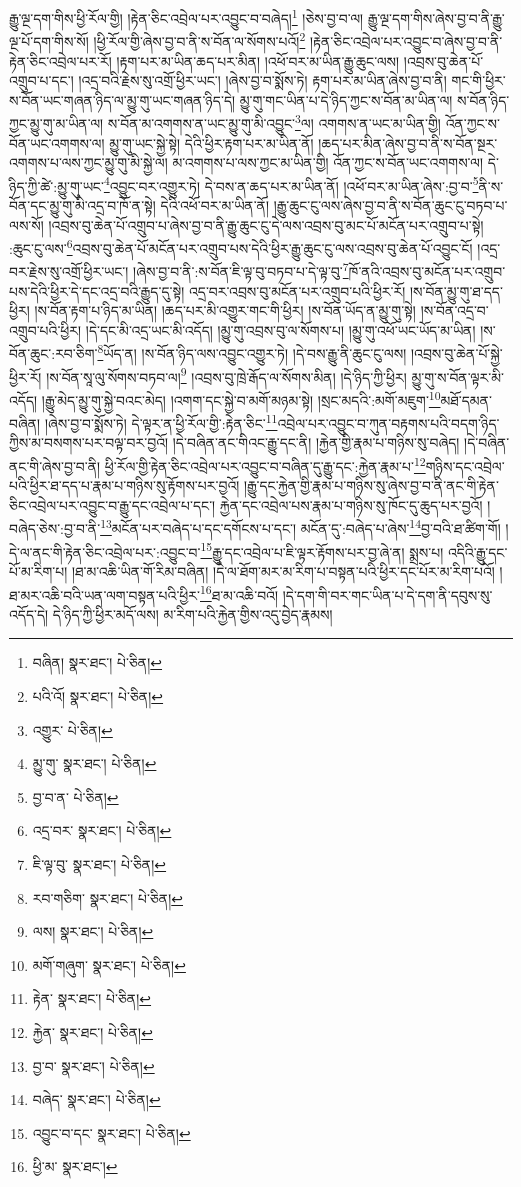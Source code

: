 རྒྱུ་ལྔ་དག་གིས་ཕྱི་རོལ་གྱི། །རྟེན་ཅིང་འབྲེལ་པར་འབྱུང་བ་བཞེད།\footnote{བཞིན།  སྣར་ཐང་།  པེ་ཅིན། } །ཅེས་བྱ་བ་ལ། རྒྱུ་ལྔ་དག་གིས་ཞེས་བྱ་བ་ནི་རྒྱུ་ལྔ་པོ་དག་གིས་སོ། །ཕྱི་རོལ་གྱི་ཞེས་བྱ་བ་ནི་ས་བོན་ལ་སོགས་པའོ།\footnote{པའི་འོ།  སྣར་ཐང་།  པེ་ཅིན། } །རྟེན་ཅིང་འབྲེལ་པར་འབྱུང་བ་ཞེས་བྱ་བ་ནི་རྟེན་ཅིང་འབྲེལ་པར་རོ། །རྟག་པར་མ་ཡིན་ཆད་པར་མིན། །འཕོ་བར་མ་ཡིན་རྒྱུ་ཆུང་ལས། །འབྲས་བུ་ཆེན་པོ་འགྲུབ་པ་དང་། །འདྲ་བའི་རྗེས་སུ་འགྲོ་ཕྱིར་ཡང་། །ཞེས་བྱ་བ་སྨོས་ཏེ། རྟག་པར་མ་ཡིན་ཞེས་བྱ་བ་ནི། གང་གི་ཕྱིར་ས་བོན་ཡང་གཞན་ཉིད་ལ་མྱུ་གུ་ཡང་གཞན་ཉིད་དེ། མྱུ་གུ་གང་ཡིན་པ་དེ་ཉིད་ཀྱང་ས་བོན་མ་ཡིན་ལ། ས་བོན་ཉིད་ཀྱང་མྱུ་གུ་མ་ཡིན་ལ། ས་བོན་མ་འགགས་ན་ཡང་མྱུ་གུ་མི་འབྱུང་\footnote{འགྱུར་  པེ་ཅིན། }ལ། འགགས་ན་ཡང་མ་ཡིན་གྱི། འོན་ཀྱང་ས་བོན་ཡང་འགགས་ལ། མྱུ་གུ་ཡང་སྐྱེ་སྟེ། དེའི་ཕྱིར་རྟག་པར་མ་ཡིན་ནོ། །ཆད་པར་མིན་ཞེས་བྱ་བ་ནི་ས་བོན་སྔར་འགགས་པ་ལས་ཀྱང་མྱུ་གུ་མི་སྐྱེ་ལ། མ་འགགས་པ་ལས་ཀྱང་མ་ཡིན་གྱི། འོན་ཀྱང་ས་བོན་ཡང་འགགས་ལ། དེ་ཉིད་ཀྱི་ཚེ་:མྱུ་གུ་ཡང་\footnote{མྱུ་གུ་  སྣར་ཐང་།  པེ་ཅིན། }འབྱུང་བར་འགྱུར་ཏེ། དེ་བས་ན་ཆད་པར་མ་ཡིན་ནོ། །འཕོ་བར་མ་ཡིན་ཞེས་:བྱ་བ་\footnote{བྱ་བ་ན་  པེ་ཅིན། }ནི་ས་བོན་དང་མྱུ་གུ་མི་འདྲ་བ་ཁོ་ན་སྟེ། དེའི་འཕོ་བར་མ་ཡིན་ནོ། །རྒྱུ་ཆུང་ངུ་ལས་ཞེས་བྱ་བ་ནི་ས་བོན་ཆུང་ངུ་བཏབ་པ་ལས་སོ། །འབྲས་བུ་ཆེན་པོ་འགྲུབ་པ་ཞེས་བྱ་བ་ནི་རྒྱུ་ཆུང་ངུ་དེ་ལས་འབྲས་བུ་མང་པོ་མངོན་པར་འགྲུབ་པ་སྟེ། :ཆུང་ངུ་ལས་\footnote{འདྲ་བར་  སྣར་ཐང་།  པེ་ཅིན། }འབྲས་བུ་ཆེན་པོ་མངོན་པར་འགྲུབ་པས་དེའི་ཕྱིར་རྒྱུ་ཆུང་ངུ་ལས་འབྲས་བུ་ཆེན་པོ་འབྱུང་ངོ། །འདྲ་བར་རྗེས་སུ་འགྲོ་ཕྱིར་ཡང་། །ཞེས་བྱ་བ་ནི་:ས་བོན་ཇི་ལྟ་བུ་བཏབ་པ་དེ་ལྟ་བུ་\footnote{ཇི་ལྟ་བུ་  སྣར་ཐང་།  པེ་ཅིན། }ཁོ་ནའི་འབྲས་བུ་མངོན་པར་འགྲུབ་པས་དེའི་ཕྱིར་དེ་དང་འདྲ་བའི་རྒྱུད་དུ་སྟེ། འདྲ་བར་འབྲས་བུ་མངོན་པར་འགྲུབ་པའི་ཕྱིར་རོ། །ས་བོན་མྱུ་གུ་ཐ་དད་ཕྱིར། །ས་བོན་རྟག་པ་ཉིད་མ་ཡིན། །ཆད་པར་མི་འགྱུར་གང་གི་ཕྱིར། །ས་བོན་ཡོད་ན་མྱུ་གུ་སྟེ། །ས་བོན་འདྲ་བ་འགྲུབ་པའི་ཕྱིར། །དེ་དང་མི་འདྲ་ཡང་མི་འདོད། །མྱུ་གུ་འབྲས་བུ་ལ་སོགས་པ། །མྱུ་གུ་འཕོ་ཡང་ཡོད་མ་ཡིན། །ས་བོན་ཆུང་:རབ་ཅིག་\footnote{རབ་གཅིག་  སྣར་ཐང་།  པེ་ཅིན། }ཡོད་ན། །ས་བོན་ཉིད་ལས་འབྱུང་འགྱུར་ཏེ། །དེ་བས་རྒྱུ་ནི་ཆུང་ངུ་ལས། །འབྲས་བུ་ཆེན་པོ་སྐྱེ་ཕྱིར་རོ། །ས་བོན་སཱ་ལུ་སོགས་བཏབ་ལ།\footnote{ལས།  སྣར་ཐང་།  པེ་ཅིན། } །འབྲས་བུ་ཁྲེ་རྒོད་ལ་སོགས་མིན། །དེ་ཉིད་ཀྱི་ཕྱིར། མྱུ་གུ་ས་བོན་ལྟར་མི་འདོད། །རྒྱུ་མེད་མྱུ་གུ་སྐྱེ་བའང་མེད། །འགག་དང་སྐྱེ་བ་མགོ་མཉམ་སྟེ། །སྲང་མདའི་:མགོ་མཇུག་\footnote{མགོ་གཞུག་  སྣར་ཐང་།  པེ་ཅིན། }མཐོ་དམན་བཞིན། །ཞེས་བྱ་བ་སྨོས་ཏེ། དེ་ལྟར་ན་ཕྱི་རོལ་གྱི་:རྟེན་ཅིང་\footnote{རྟེན་  སྣར་ཐང་།  པེ་ཅིན། }འབྲེལ་པར་འབྱུང་བ་ཀུན་བརྟགས་པའི་བདག་ཉིད་ཀྱིས་མ་བསགས་པར་བལྟ་བར་བྱའོ། །དེ་བཞིན་ནང་གིའང་རྒྱུ་དང་ནི། །རྐྱེན་གྱི་རྣམ་པ་གཉིས་སུ་བཞེད། །དེ་བཞིན་ནང་གི་ཞེས་བྱ་བ་ནི། ཕྱི་རོལ་གྱི་རྟེན་ཅིང་འབྲེལ་པར་འབྱུང་བ་བཞིན་དུ་རྒྱུ་དང་:རྐྱེན་རྣམ་པ་\footnote{རྐྱེན་  སྣར་ཐང་།  པེ་ཅིན། }གཉིས་དང་འབྲེལ་པའི་ཕྱིར་ཐ་དད་པ་རྣམ་པ་གཉིས་སུ་རྟོགས་པར་བྱའོ། །རྒྱུ་དང་རྐྱེན་གྱི་རྣམ་པ་གཉིས་སུ་ཞེས་བྱ་བ་ནི་ནང་གི་རྟེན་ཅིང་འབྲེལ་པར་འབྱུང་བ་རྒྱུ་དང་འབྲེལ་པ་དང་། རྐྱེན་དང་འབྲེལ་པས་རྣམ་པ་གཉིས་སུ་ཁོང་དུ་ཆུད་པར་བྱའོ། །བཞེད་ཅེས་:བྱ་བ་ནི་\footnote{བྱ་བ་  སྣར་ཐང་།  པེ་ཅིན། }མངོན་པར་བཞེད་པ་དང་དགོངས་པ་དང་། མངོན་དུ་:བཞེད་པ་ཞེས་\footnote{བཞེད་  སྣར་ཐང་།  པེ་ཅིན། }བྱ་བའི་ཐ་ཚིག་གོ། །དེ་ལ་ནང་གི་རྟེན་ཅིང་འབྲེལ་པར་:འབྱུང་བ་\footnote{འབྱུང་བ་དང་  སྣར་ཐང་།  པེ་ཅིན། }རྒྱུ་དང་འབྲེལ་པ་ཇི་ལྟར་རྟོགས་པར་བྱ་ཞེ་ན། སྨྲས་པ། འདིའི་རྒྱུ་དང་པོ་མ་རིག་པ། །ཐ་མ་འཆི་ཡིན་གོ་རིམ་བཞིན། །དེ་ལ་ཐོག་མར་མ་རིག་པ་བསྟན་པའི་ཕྱིར་དང་པོར་མ་རིག་པའོ། །ཐ་མར་འཆི་བའི་ཡན་ལག་བསྟན་པའི་ཕྱིར་\footnote{ཕྱི་མ་  སྣར་ཐང་། }ཐ་མ་འཆི་བའོ། །དེ་དག་གི་བར་གང་ཡིན་པ་དེ་དག་ནི་དབུས་སུ་འདོད་དེ། དེ་ཉིད་ཀྱི་ཕྱིར་མདོ་ལས། མ་རིག་པའི་རྐྱེན་གྱིས་འདུ་བྱེད་རྣམས། 